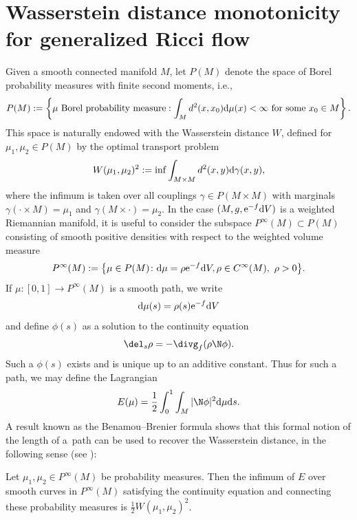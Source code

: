 \section{Wasserstein distance monotonicity for generalized Ricci flow}

Given a smooth connected manifold $M$, let $P(M)$ denote the space of Borel probability measures with finite second moments, i.e.,
\begin{align*}
 P(M):=\left\{\mu \text{ Borel probability measure}: \int_Md^2(x,x_0) {\rm d}\mu(x)<\infty \text{ for some }x_0\in M\right\}.
\end{align*} This space is naturally endowed with the Wasserstein distance $W$, defined for $\mu_1,\mu_2\in P(M)$ by the optimal transport problem
\begin{align*}
 W(\mu_1,\mu_2)^2:=\inf\int_{M\times M}d^2(x,y) {\rm d}\gamma(x,y),
\end{align*}
where the infimum is taken over all couplings $\gamma\in P(M\times M)$ with marginals $\gamma(\cdot\times M)=\mu_1$ and $\gamma(M\times \cdot)=\mu_2$. In the case $(M, g, {\rm e}^{-f} {\rm d}V)$ is a weighted Riemannian manifold, it is useful to consider the subspace $P^\infty(M)\subset P(M)$ consisting of smooth positive densities with respect to the weighted volume measure
\begin{align*}
 P^\infty(M):=\bigl\{\mu\in P(M)\colon {\rm d}\mu=\rho {\rm e}^{-f} {\rm d}V, \rho\in C^\infty(M),\ \rho>0\bigr\}.
\end{align*}
If $\mu\colon[0,1]\to P^\infty(M)$ is a smooth path, we write
\begin{align*}
 {\rm d}\mu(s)=\rho(s) {\rm e}^{-f} {\rm d}V
\end{align*}
and define $\phi(s)$ as a solution to the continuity equation
\begin{align}\label{eq: conteqstatic}
 \del_s\rho=-\divg_f(\rho\N\phi).
\end{align}
Such a $\phi(s)$ exists and is unique up to an additive constant.
Thus for such a path, we may define the Lagrangian
\begin{align*}
 E(\mu)=\frac12\int_0^1\int_M |\N\phi|^2 {\rm d}\mu {\rm d}s.
\end{align*}
A result known as the Benamou--Brenier formula shows that this formal notion of the length of a~path can be used to recover the Wasserstein distance, in the following sense (see \cite[Proposition~4.3]{OW05}):
\begin{thm}\label{thm: existence}
Let $\mu_1,\mu_2\in P^\infty(M)$ be probability measures. Then the infimum of $E$ over smooth curves in $P^\infty(M)$ satisfying the continuity equation and connecting these probability measures is $\frac12 W(\mu_1,\mu_2)^2$.
\end{thm}

